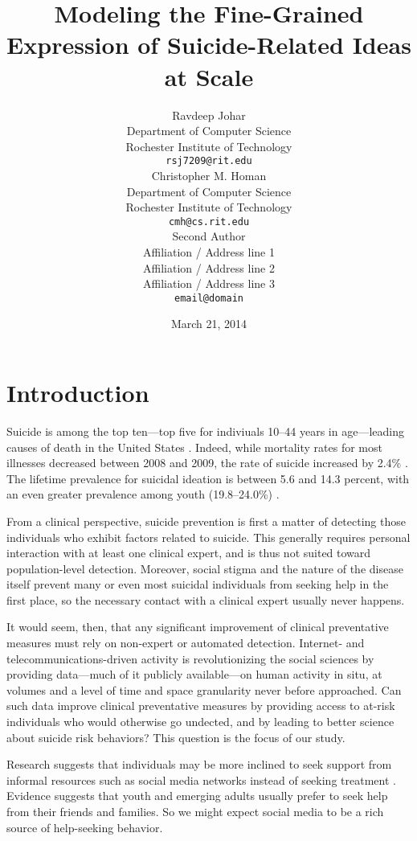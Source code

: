\documentclass[11pt]{article}
\title{Modeling the Fine-Grained Expression of Suicide-Related Ideas at Scale}
\author{Ravdeep Johar\\
  Department of Computer Science \\
  Rochester Institute of Technology \\
  {\tt rsj7209@rit.edu} \\\And
 Christopher M. Homan\\
  Department of Computer Science \\
  Rochester Institute of Technology \\
  {\tt cmh@cs.rit.edu}\\\And
  Second Author \\
  Affiliation / Address line 1 \\
  Affiliation / Address line 2 \\
  Affiliation / Address line 3 \\
  {\tt email@domain} \\}
\date{March 21, 2014}
\begin{document}
\maketitle
\begin{abstract}
 \end{abstract}

\section{Introduction}

Suicide is among the top ten---top five for indiviuals 10--44 years in age---leading causes of death in the United States \cite{heron2009deaths}. Indeed, while mortality rates for most illnesses decreased between 2008 and 2009, the rate of suicide increased by 2.4\%  \cite{heron2009deaths}. The lifetime prevalence for suicidal ideation is between 5.6 and 14.3 percent, with an even greater prevalence among youth (19.8–24.0\%) \cite{nock2008suicide}. 

From a clinical perspective, suicide prevention is first a matter of detecting those individuals who exhibit factors related to suicide. This generally requires personal interaction with at least one clinical expert, and is thus not suited toward population-level detection. Moreover, social stigma and the nature of the disease itself prevent many or even most suicidal individuals from seeking help in the first place, so the necessary contact with a clinical expert usually never happens. 

It would seem, then, that any significant improvement of clinical preventative measures must rely on non-expert or automated detection. 
Internet- and telecommunications-driven activity is revolutionizing the social sciences by providing data---much of it publicly available---on human activity in situ, at volumes and a level of time and space granularity never before approached. Can such data improve clinical preventative measures by providing access to at-risk individuals who would otherwise go undected, and by leading to better science about suicide risk behaviors? This question is the focus of our study.





Research suggests that individuals may be more inclined to seek support from informal resources such as social media networks instead of seeking treatment \cite{crosby2011self,bruffaerts2011treatment,ryan2010universal}. Evidence suggests that youth and emerging adults usually prefer to seek help from their friends and families. So we might expect social media to be a rich source of help-seeking behavior. 
\end{document}
